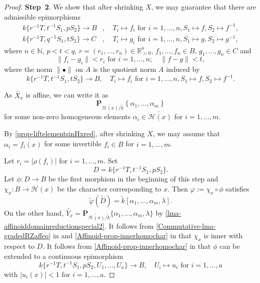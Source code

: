 \begin{proof}
    \textbf{Step~2}. We show that after shrinking $X$, we may guarantee that there are admissible epimorphisms 
    \begin{equation}\label{eq-admepiintermstep}
        \begin{aligned}
        k\{r^{-1}T,t^{-1}S_1,pS_2\}\rightarrow B &,\quad T_i\mapsto f_i \text{ for } i=1,\ldots,n,S_1\mapsto f ,S_2\mapsto f^{-1},\\
        k\{r^{-1}T,q^{-1}S_1,tS_2\}\rightarrow C &,\quad T_i\mapsto g_i \text{ for } i=1,\ldots,n,S_1\mapsto g ,S_2\mapsto g^{-1},
        \end{aligned}
    \end{equation}
    where $n\in \mathbb{N}$, $p<t<q$, $r=(r_1,\ldots,r_n)\in \mathbb{R}^n_{>0}$, $f_1,\ldots,f_n\in B$, $g_1,\ldots,g_n\in C$ and 
    \[
        \|f_i-g_i\|<r_i\text{ for }i=1,\ldots,n;\quad  \|f-g\|< t, 
    \]
    where the norm $\|\bullet\|$ on $A$ is the quotient norm $A$ induced by
    \[
        k\{r^{-1}T,t^{-1}S_1,tS_2\}\rightarrow B,\quad T_i\mapsto f_i\text{ for } i=1,\ldots,n, S_1\mapsto f, S_2\mapsto f^{-1}.
    \]

    As $\widetilde{X_x}$ is affine, we can write it as 
    \[
        \mathbf{P}_{\widetilde{\mathscr{H}(x)}/\tilde{k}}\left\{\alpha_1,\ldots,\alpha_m\right\}  
    \]
    for some non-zero homogeneous elements $\alpha_i\in \widetilde{\mathscr{H}(x)}$ for $i=1,\ldots,m$. 
    
    By \cref{prop-liftelementsinHxred}, after shrinking $X$, we may assume that $\alpha_i=\widetilde{f_i(x)}$ for some invertible $f_i\in B$ for $i=1,\ldots,m$. 
    
    Let $r_i=|\rho(f_i)|$ for $i=1,\ldots,m$. Set 
    \[
        D=k\{r^{-1}T,t^{-1}S_1,pS_2\}.  
    \]
    Let $\phi:D\rightarrow B$ be the first morphism in the beginning of this step and $\chi_x:B\rightarrow \mathscr{H}(x)$ be the character corresponding to $x$. Then $\varphi:=\chi_x\circ \phi$ satisfies
    \[
        \tilde{\varphi}(\tilde{D})=\tilde{k}[\alpha_1,\ldots,\alpha_m,\lambda].
    \]
    On the other hand, $\widetilde{Y_x}=\mathbf{P}_{\widetilde{\mathscr{H}(x)}/\tilde{k}}\{\alpha_1,\ldots,\alpha_m,\lambda\}$ by \cref{lma-affinoiddomainreductionspecial2}. It follows from \cref{Commutative-lma-gradedRZaffeq} in  and \cref{Affinoid-prop-innerhomochar} in  that $\chi_x$ is inner with respect to $D$. It follows from \cref{Affinoid-prop-innerhomochar} in  that $\phi$ can be extended to a continuous epimorphism
    \[
        k\{r^{-1}T,t^{-1}S_1,pS_2,U_1,\ldots,U_a\}\rightarrow B,\quad U_i\mapsto u_i\text{ for }i=1,\ldots,a  
    \]
    with $|u_i(x)|<1$ for $i=1,\ldots,a$.


\end{proof}

